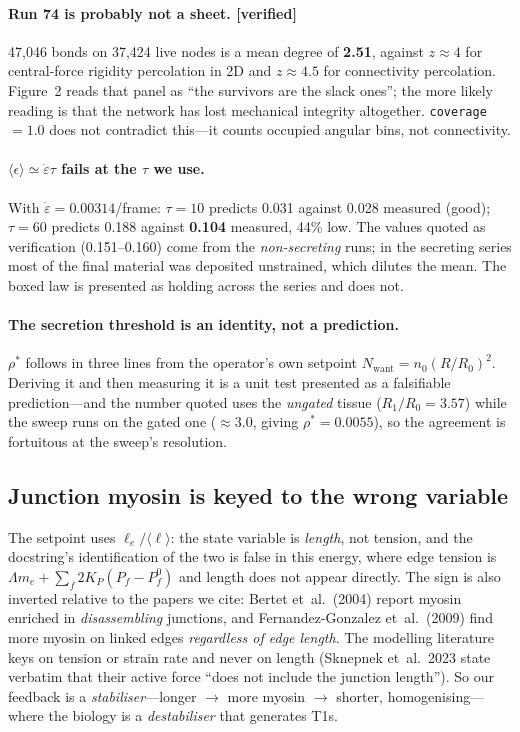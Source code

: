\documentclass[10pt]{article}
\begin{document}
\paragraph{Run 74 is probably not a sheet. [verified]} 47{,}046 bonds on 37{,}424 live nodes is a mean
degree of \textbf{2.51}, against $z\approx4$ for central-force rigidity percolation in 2D and
$z\approx4.5$ for connectivity percolation. Figure~2 reads that panel as ``the survivors are the slack
ones''; the more likely reading is that the network has lost mechanical integrity altogether.
\texttt{coverage}$=1.0$ does not contradict this---it counts occupied angular bins, not connectivity.

\paragraph{$\langle\epsilon\rangle\simeq\dot\varepsilon\tau$ fails at the $\tau$ we use.} With
$\dot\varepsilon=0.00314$/frame: $\tau=10$ predicts 0.031 against 0.028 measured (good); $\tau=60$
predicts 0.188 against \textbf{0.104} measured, 44\% low. The values quoted as verification (0.151--0.160)
come from the \emph{non-secreting} runs; in the secreting series most of the final material was deposited
unstrained, which dilutes the mean. The boxed law is presented as holding across the series and does not.

\paragraph{The secretion threshold is an identity, not a prediction.} $\rho^\ast$ follows in three lines
from the operator's own setpoint $N_{\text{want}}=n_0(R/R_0)^2$. Deriving it and then measuring it is a
unit test presented as a falsifiable prediction---and the number quoted uses the \emph{ungated} tissue
($R_1/R_0=3.57$) while the sweep runs on the gated one ($\approx3.0$, giving $\rho^\ast=0.0055$), so the
agreement is fortuitous at the sweep's resolution.

\subsection*{Junction myosin is keyed to the wrong variable}

The setpoint uses $\ell_e/\langle\ell\rangle$: the state variable is \emph{length}, not tension, and the
docstring's identification of the two is false in this energy, where edge tension is
$\Lambda m_e+\sum_f 2K_P(P_f-P_f^0)$ and length does not appear directly. The sign is also inverted
relative to the papers we cite: Bertet et~al.\ (2004) report myosin enriched in \emph{disassembling}
junctions, and Fernandez-Gonzalez et~al.\ (2009) find more myosin on linked edges \emph{regardless of
edge length}. The modelling literature keys on tension or strain rate and never on length
(Sknepnek et~al.\ 2023 state verbatim that their active force ``does not include the junction length'').
So our feedback is a \emph{stabiliser}---longer $\to$ more myosin $\to$ shorter, homogenising---where the
biology is a \emph{destabiliser} that generates T1s.
\end{document}
